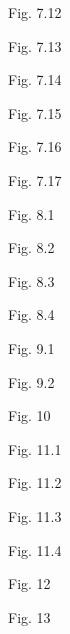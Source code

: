 \newpage
\vspace*{\fill}
\centerline{Fig. 7.12}

\newpage
\vspace*{\fill}
\centerline{Fig. 7.13}

\newpage
\vspace*{\fill}
\centerline{Fig. 7.14}

\newpage
\vspace*{\fill}
\centerline{Fig. 7.15}

\newpage
\vspace*{\fill}
\centerline{Fig. 7.16}

\newpage
\vspace*{\fill}
\centerline{Fig. 7.17}

\newpage
\vspace*{\fill}
\centerline{Fig. 8.1}

\newpage
\vspace*{\fill}
\centerline{Fig. 8.2}

\newpage
\vspace*{\fill}
\centerline{Fig. 8.3}

\newpage
\vspace*{\fill}
\centerline{Fig. 8.4}

\newpage
\vspace*{\fill}
\centerline{Fig. 9.1}

\newpage
\vspace*{\fill}
\centerline{Fig. 9.2}

\newpage
\vspace*{\fill}
\centerline{Fig. 10}

\newpage
\vspace*{\fill}
\centerline{Fig. 11.1}

\newpage
\vspace*{\fill}
\centerline{Fig. 11.2}

\newpage
\vspace*{\fill}
\centerline{Fig. 11.3}

\newpage
\vspace*{\fill}
\centerline{Fig. 11.4}

\newpage
\vspace*{\fill}
\centerline{Fig. 12}

\newpage
\vspace*{\fill}
\centerline{Fig. 13}


